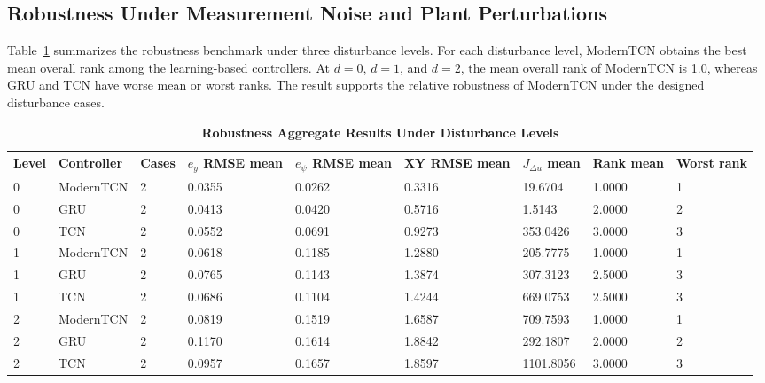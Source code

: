 \documentclass[twocolumn]{article}
\begin{document}
\subsection{Robustness Under Measurement Noise and Plant Perturbations}

Table~\ref{tab:robustness_aggregate} summarizes the robustness benchmark under three disturbance levels. For each disturbance level, ModernTCN obtains the best mean overall rank among the learning-based controllers. At $d=0$, $d=1$, and $d=2$, the mean overall rank of ModernTCN is 1.0, whereas GRU and TCN have worse mean or worst ranks. The result supports the relative robustness of ModernTCN under the designed disturbance cases.

\begin{table}[!t]

\caption{\textbf{Robustness Aggregate Results Under Disturbance Levels}}

\label{tab:robustness_aggregate}

\setlength{\tabcolsep}{4pt}

\begin{tabular}{|p{42pt}|p{76pt}|p{42pt}|p{52pt}|p{52pt}|p{52pt}|p{56pt}|p{54pt}|p{48pt}|}

\hline

Level & Controller & Cases & $e_y$ RMSE mean & $e_{\psi}$ RMSE mean & XY RMSE mean & $J_{\Delta u}$ mean & Rank mean & Worst rank \\

\hline

0 & ModernTCN & 2 & 0.0355 & 0.0262 & 0.3316 & 19.6704 & 1.0000 & 1 \\

0 & GRU & 2 & 0.0413 & 0.0420 & 0.5716 & 1.5143 & 2.0000 & 2 \\

0 & TCN & 2 & 0.0552 & 0.0691 & 0.9273 & 353.0426 & 3.0000 & 3 \\

1 & ModernTCN & 2 & 0.0618 & 0.1185 & 1.2880 & 205.7775 & 1.0000 & 1 \\

1 & GRU & 2 & 0.0765 & 0.1143 & 1.3874 & 307.3123 & 2.5000 & 3 \\

1 & TCN & 2 & 0.0686 & 0.1104 & 1.4244 & 669.0753 & 2.5000 & 3 \\

2 & ModernTCN & 2 & 0.0819 & 0.1519 & 1.6587 & 709.7593 & 1.0000 & 1 \\

2 & GRU & 2 & 0.1170 & 0.1614 & 1.8842 & 292.1807 & 2.0000 & 2 \\

2 & TCN & 2 & 0.0957 & 0.1657 & 1.8597 & 1101.8056 & 3.0000 & 3 \\

\hline

\end{tabular}

\end{table}
\end{document}
